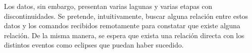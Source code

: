\documentclass[../Main.tex]{subfiles}
\begin{document}
\newline \par 
Los datos, sin embargo, presentan varias lagunas y varias etapas con discontinuidades. Se pretende, intuitivamente, buscar alguna relación entre estos datos y los comandos recibidos remotamente para constatar que existe alguna relación. De la misma manera, se espera que exista una relación directa con los distintos eventos como eclipses que puedan haber sucedido.
\end{document}
